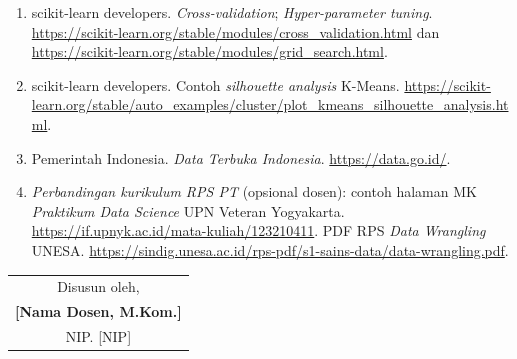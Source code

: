 \documentclass[12pt,a4paper]{article}
\begin{document}
\begin{enumerate}[leftmargin=*]
  \item scikit-learn developers. \textit{Cross-validation}; \textit{Hyper-parameter tuning}. \url{https://scikit-learn.org/stable/modules/cross_validation.html} dan \url{https://scikit-learn.org/stable/modules/grid_search.html}.

  \item scikit-learn developers. Contoh \textit{silhouette analysis} K-Means. \url{https://scikit-learn.org/stable/auto_examples/cluster/plot_kmeans_silhouette_analysis.html}.

  \item Pemerintah Indonesia. \textit{Data Terbuka Indonesia}. \url{https://data.go.id/}.

  \item \textit{Perbandingan kurikulum RPS PT} (opsional dosen): contoh halaman MK \textit{Praktikum Data Science} UPN Veteran Yogyakarta. \url{https://if.upnyk.ac.id/mata-kuliah/123210411}. PDF RPS \textit{Data Wrangling} UNESA. \url{https://sindig.unesa.ac.id/rps-pdf/s1-sains-data/data-wrangling.pdf}.
\end{enumerate}

\vspace{1cm}

\begin{flushright}
\begin{tabular}{c}
Disusun oleh,\\[2cm]
\textbf{[Nama Dosen, M.Kom.]}\\
NIP. [NIP]
\end{tabular}
\end{flushright}
\end{document}

